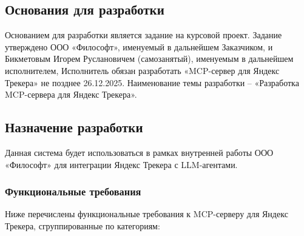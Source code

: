 \documentclass[utf8, russian]{eskdtext}
\begin{document}
\subsection{Основания для разработки}
Основанием для разработки является задание на курсовой проект. Задание утверждено ООО «Философт», именуемый в дальнейшем Заказчиком, и Бикметовым Игорем Руслановичем (самозанятый), именуемым в дальнейшем исполнителем, Исполнитель обязан разработать «MCP-сервер для Яндекс Трекера» не позднее 26.12.2025. Наименование темы разработки – «Разработка MCP-сервера для Яндекс Трекера».

\subsection{Назначение разработки}
Данная система будет использоваться в рамках внутренней работы ООО «Философт» для интеграции Яндекс Трекера с LLM-агентами.

\subsubsection{Функциональные требования}

Ниже перечислены функциональные требования к MCP-серверу для Яндекс Трекера, сгруппированные по категориям:
\end{document}
